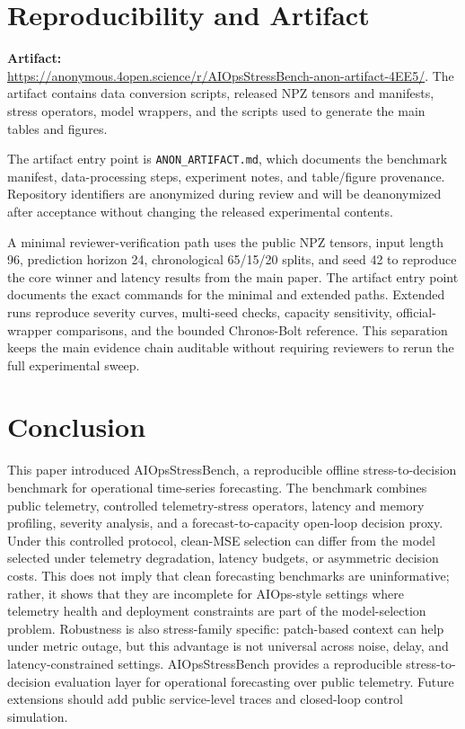 \documentclass[conference]{IEEEtran}
\begin{document}
\section{Reproducibility and Artifact}

\noindent\textbf{Artifact:}\\
\url{https://anonymous.4open.science/r/AIOpsStressBench-anon-artifact-4EE5/}.
The artifact contains data conversion scripts, released NPZ tensors and manifests, stress operators, model wrappers, and the scripts used to generate the main tables and figures.

The artifact entry point is \texttt{ANON\_ARTIFACT.md}, which documents the benchmark manifest, data-processing steps, experiment notes, and table/figure provenance. Repository identifiers are anonymized during review and will be deanonymized after acceptance without changing the released experimental contents.

A minimal reviewer-verification path uses the public NPZ tensors, input length 96, prediction horizon 24, chronological 65/15/20 splits, and seed 42 to reproduce the core winner and latency results from the main paper. The artifact entry point documents the exact commands for the minimal and extended paths. Extended runs reproduce severity curves, multi-seed checks, capacity sensitivity, official-wrapper comparisons, and the bounded Chronos-Bolt reference. This separation keeps the main evidence chain auditable without requiring reviewers to rerun the full experimental sweep.

\section{Conclusion}

This paper introduced AIOpsStressBench, a reproducible offline stress-to-decision benchmark for operational time-series forecasting. The benchmark combines public telemetry, controlled telemetry-stress operators, latency and memory profiling, severity analysis, and a forecast-to-capacity open-loop decision proxy. Under this controlled protocol, clean-MSE selection can differ from the model selected under telemetry degradation, latency budgets, or asymmetric decision costs. This does not imply that clean forecasting benchmarks are uninformative; rather, it shows that they are incomplete for AIOps-style settings where telemetry health and deployment constraints are part of the model-selection problem. Robustness is also stress-family specific: patch-based context can help under metric outage, but this advantage is not universal across noise, delay, and latency-constrained settings. AIOpsStressBench provides a reproducible stress-to-decision evaluation layer for operational forecasting over public telemetry. Future extensions should add public service-level traces and closed-loop control simulation.
\end{document}

